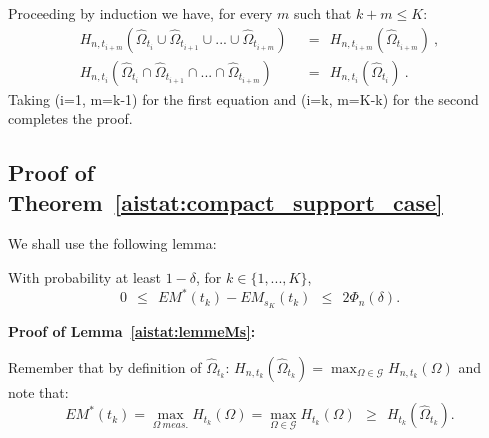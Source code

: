 \noindent
Proceeding by induction we have, for every $m$ such that $k+m \le K$:
\begin{align*}
H_{n,t_{i+m}}(\hat \Omega_{t_i} \cup \hat \Omega_{t_{i+1}} \cup ... \cup \hat \Omega_{t_{i+m}}) &~~=~~ H_{n,t_{i+m}}(\hat \Omega_{t_{i+m}})~,\\
H_{n,t_i}(\hat \Omega_{t_i} \cap \hat \Omega_{t_{i+1}} \cap ... \cap \hat \Omega_{t_{i+m}}) &~~=~~ H_{n,t_i}(\hat \Omega_{t_i})~.
\end{align*}
Taking (i=1, m=k-1) for the first equation and  (i=k, m=K-k) for the second completes the proof.\\



\subsection*{Proof of Theorem~\ref{aistat:compact_support_case}}

We shall use the following lemma:
\begin{lemma}
\label{aistat:lemmeMs}
With probability at least $1-\delta$, for $k \in \{1,...,K\}$, $$0 ~~\le~~ EM^*(t_{k})-EM_{s_K}(t_k) ~~\le~~ 2 \Phi_n(\delta).$$ 
\end{lemma}
\noindent

\textbf{Proof of Lemma~\ref{aistat:lemmeMs}: } 

Remember that by definition of $\hat \Omega_{t_k}$: $H_{n,t_k}(\hat \Omega_{t_k})=\max_{\Omega \in \mathcal{G}} H_{n,t_k}(\Omega) $ and note that:
$$EM^*(t_k)=\max_{\Omega~ meas.} H_{t_k}(\Omega)=\max_{\Omega \in \mathcal{G}} H_{t_k}(\Omega) ~~\ge~~ H_{t_k}(\hat \Omega_{t_k}). $$

